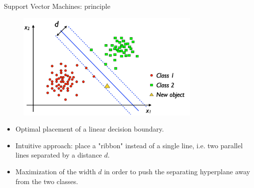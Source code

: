 \documentclass[xcolor=pdftex,dvipsnames,table]{beamer}
\begin{document}
\begin{frame}{Support Vector Machines: principle}
	\begin{figure}[htb]
		\includegraphics[width=0.8\textwidth]{../graphics/SVM_general.pdf}
	\end{figure}
	\begin{itemize}
		\item Optimal placement of a linear decision boundary.
		\item Intuitive approach: place a "ribbon" instead of a single line, i.e. two parallel lines separated by a distance $d$.
		\item Maximization of the width $d$ in order to push the separating hyperplane away from the two classes.
	\end{itemize}
\end{frame}

\end{document}
